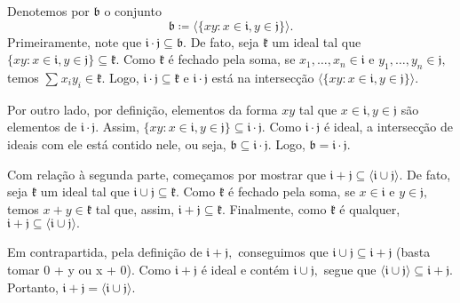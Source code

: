 \documentclass[algebraII_notes.tex]{subfiles}
\begin{document}
\begin{proof*}
	Denotemos por \(\mathfrak{b}\) o conjunto
	\[
		\mathfrak{b}\coloneqq \langle \{xy:x\in \mathfrak{i}, y\in \mathfrak{j}\} \rangle.
	\]
	Primeiramente, note que \(\mathfrak{i}\cdot \mathfrak{j}\subseteq{\mathfrak{b}}.\) De fato, seja \(\mathfrak{k}\) um ideal tal que \(\{xy:x\in \mathfrak{i}, y\in \mathfrak{j}\}\subseteq{\mathfrak{k}}.\)
	Como \(\mathfrak{k}\) é fechado pela soma, se \(x_{1}, \dotsc, x_{n}\in \mathfrak{i}\) e \(y_{1},\dotsc,y_{n}\in \mathfrak{j},\) temos
	\(\sum\limits_{}^{}x_{i}y_{i}\in \mathfrak{k}.\) Logo, \(\mathfrak{i}\cdot \mathfrak{j}\subseteq{\mathfrak{k}}\) e \(\mathfrak{i}\cdot \mathfrak{j}\) está
	na intersecção \(\langle \{xy: x\in \mathfrak{i}, y\in \mathfrak{j}\} \rangle.\)

	Por outro lado, por definição, elementos da forma \(xy\) tal que \(x\in \mathfrak{i}, y\in \mathfrak{j}\) são elementos
	de \(\mathfrak{i}\cdot \mathfrak{j}.\) Assim, \(\{xy:x\in \mathfrak{i}, y\in \mathfrak{j}\}\subseteq{\mathfrak{i}\cdot \mathfrak{j}}.\) Como
	\(\mathfrak{i}\cdot \mathfrak{j}\) é ideal, a intersecção de ideais com ele está contido nele, ou seja, \(\mathfrak{b}\subseteq{\mathfrak{i}\cdot \mathfrak{j}}\).
	Logo, \(\mathfrak{b} = \mathfrak{i}\cdot \mathfrak{j}.\)

	Com relação à segunda parte, começamos por mostrar que \(\mathfrak{i}+\mathfrak{j}\subseteq{\langle \mathfrak{i}\cup \mathfrak{j} \rangle}.\) De fato,
	seja \(\mathfrak{k}\) um ideal tal que \(\mathfrak{i}\cup \mathfrak{j}\subseteq{\mathfrak{k}}.\) Como \(\mathfrak{k}\) é fechado pela soma,
	se \(x\in \mathfrak{i}\) e \(y\in \mathfrak{j},\) temos \(x+y\in \mathfrak{k}\) tal que, assim, \(\mathfrak{i} + \mathfrak{j}\subseteq{\mathfrak{k}}\).
	Finalmente, como \(\mathfrak{k}\) é qualquer, \(\mathfrak{i}+\mathfrak{j}\subseteq{\langle \mathfrak{i}\cup \mathfrak{j} \rangle}.\)

	Em contrapartida, pela definição de \(\mathfrak{i} + \mathfrak{j},\) conseguimos
	que \(\mathfrak{i}\cup \mathfrak{j}\subseteq{\mathfrak{i}+\mathfrak{j}}\) (basta tomar 0 + y ou x + 0).
	Como \(\mathfrak{i} + \mathfrak{j}\) é ideal e contém \(\mathfrak{i}\cup \mathfrak{j},\) segue que \(\langle \mathfrak{i}\cup \mathfrak{j} \rangle\subseteq{\mathfrak{i}+\mathfrak{j}}\).
	Portanto, \(\mathfrak{i}+\mathfrak{j} = \langle \mathfrak{i}\cup \mathfrak{j} \rangle.\) \qedsymbol
\end{proof*}
\end{document}
